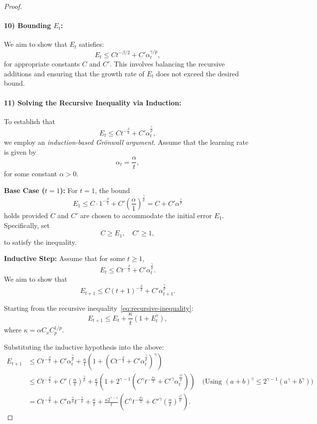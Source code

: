 \begin{proof}
\paragraph{10) Bounding \( E_t \):}  
We aim to show that \( E_t \) satisfies:
\[
E_t \leq C t^{-\beta/2} + C' \alpha_t^{\gamma/p},
\]
for appropriate constants \( C \) and \( C' \). This involves balancing the recursive additions and ensuring that the growth rate of \( E_t \) does not exceed the desired bound.

\paragraph{11) Solving the Recursive Inequality via Induction:}

To establish that
\[
E_t \leq C t^{-\tfrac{\beta}{2}} + C' \alpha_t^{\tfrac{\gamma}{p}},
\]
we employ an \emph{induction-based Grönwall argument}. Assume that the learning rate is given by
\[
\alpha_t = \frac{\alpha}{t},
\]
for some constant \( \alpha > 0 \).

\textbf{Base Case (\( t = 1 \)):}  
For \( t = 1 \), the bound
\[
E_1 \leq C \cdot 1^{-\tfrac{\beta}{2}} + C' \left(\frac{\alpha}{1}\right)^{\tfrac{\gamma}{p}} = C + C' \alpha^{\tfrac{\gamma}{p}}
\]
holds provided \( C \) and \( C' \) are chosen to accommodate the initial error \( E_1 \). Specifically, set
\[
C \geq E_1,
\quad
C' \geq 1,
\]
to satisfy the inequality.

\textbf{Inductive Step:}  
Assume that for some \( t \geq 1 \),
\[
E_t \leq C t^{-\tfrac{\beta}{2}} + C' \alpha_t^{\tfrac{\gamma}{p}}.
\]
We aim to show that
\[
E_{t+1} \leq C (t+1)^{-\tfrac{\beta}{2}} + C' \alpha_{t+1}^{\tfrac{\gamma}{p}}.
\]

Starting from the recursive inequality~\eqref{eq:recursive-inequality}:
\[
E_{t+1} \leq E_t + \frac{\kappa}{t} \left(1 + E_t^{\gamma}\right),
\]
where \( \kappa = \alpha C_x C_p^{1/p} \).

Substituting the inductive hypothesis into the above:
\begin{align*}
E_{t+1} &\leq C t^{-\tfrac{\beta}{2}} + C' \alpha_t^{\tfrac{\gamma}{p}} + \frac{\kappa}{t} \left(1 + \left(C t^{-\tfrac{\beta}{2}} + C' \alpha_t^{\tfrac{\gamma}{p}}\right)^{\gamma}\right) \\
&\leq C t^{-\tfrac{\beta}{2}} + C' \left(\frac{\alpha}{t}\right)^{\tfrac{\gamma}{p}} + \frac{\kappa}{t} \left(1 + 2^{\gamma - 1} \left(C^{\gamma} t^{-\tfrac{\beta \gamma}{2}} + C'^{\gamma} \alpha_t^{\tfrac{\gamma^2}{p}}\right)\right) \quad \text{(Using $(a+b)^\gamma \leq 2^{\gamma-1}(a^\gamma + b^\gamma)$)} \\
&= C t^{-\tfrac{\beta}{2}} + C' \alpha^{\tfrac{\gamma}{p}} t^{-\tfrac{\gamma}{p}} + \frac{\kappa}{t} + \frac{\kappa 2^{\gamma - 1}}{t} \left(C^{\gamma} t^{-\tfrac{\beta \gamma}{2}} + C'^{\gamma} \left(\frac{\alpha}{t}\right)^{\tfrac{\gamma^2}{p}}\right).
\end{align*}


\end{proof}
